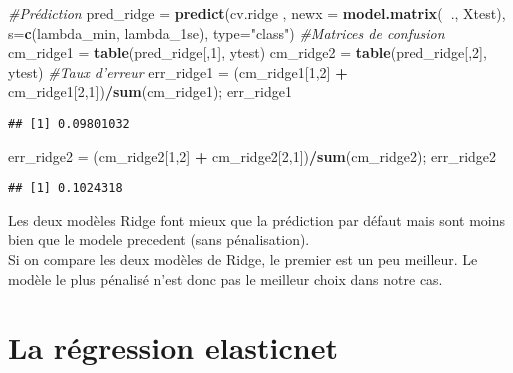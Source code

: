\documentclass[
]{article}
\newenvironment{Shaded}{\begin{snugshade}}{\end{snugshade}}
\newcommand{\CommentTok}[1]{\textcolor[rgb]{0.56,0.35,0.01}{\textit{#1}}}
\newcommand{\DataTypeTok}[1]{\textcolor[rgb]{0.13,0.29,0.53}{#1}}
\newcommand{\DecValTok}[1]{\textcolor[rgb]{0.00,0.00,0.81}{#1}}
\newcommand{\KeywordTok}[1]{\textcolor[rgb]{0.13,0.29,0.53}{\textbf{#1}}}
\newcommand{\NormalTok}[1]{#1}
\newcommand{\OperatorTok}[1]{\textcolor[rgb]{0.81,0.36,0.00}{\textbf{#1}}}
\newcommand{\StringTok}[1]{\textcolor[rgb]{0.31,0.60,0.02}{#1}}
\begin{document}
\begin{Shaded}
\begin{Highlighting}[]
\CommentTok{#Prédiction}
\NormalTok{pred_ridge =}\StringTok{ }\KeywordTok{predict}\NormalTok{(cv.ridge , }\DataTypeTok{newx =} \KeywordTok{model.matrix}\NormalTok{(}\OperatorTok{~}\NormalTok{., Xtest), }\DataTypeTok{s=}\KeywordTok{c}\NormalTok{(lambda_min, lambda_1se), }\DataTypeTok{type=}\StringTok{"class"}\NormalTok{)}
\CommentTok{#Matrices de confusion}
\NormalTok{cm_ridge1 =}\StringTok{ }\KeywordTok{table}\NormalTok{(pred_ridge[,}\DecValTok{1}\NormalTok{], ytest)}
\NormalTok{cm_ridge2 =}\StringTok{ }\KeywordTok{table}\NormalTok{(pred_ridge[,}\DecValTok{2}\NormalTok{], ytest)}
\CommentTok{#Taux d'erreur}
\NormalTok{err_ridge1 =}\StringTok{ }\NormalTok{(cm_ridge1[}\DecValTok{1}\NormalTok{,}\DecValTok{2}\NormalTok{] }\OperatorTok{+}\StringTok{ }\NormalTok{cm_ridge1[}\DecValTok{2}\NormalTok{,}\DecValTok{1}\NormalTok{])}\OperatorTok{/}\KeywordTok{sum}\NormalTok{(cm_ridge1); err_ridge1}
\end{Highlighting}
\end{Shaded}

\begin{verbatim}
## [1] 0.09801032
\end{verbatim}

\begin{Shaded}
\begin{Highlighting}[]
\NormalTok{err_ridge2 =}\StringTok{ }\NormalTok{(cm_ridge2[}\DecValTok{1}\NormalTok{,}\DecValTok{2}\NormalTok{] }\OperatorTok{+}\StringTok{ }\NormalTok{cm_ridge2[}\DecValTok{2}\NormalTok{,}\DecValTok{1}\NormalTok{])}\OperatorTok{/}\KeywordTok{sum}\NormalTok{(cm_ridge2); err_ridge2}
\end{Highlighting}
\end{Shaded}

\begin{verbatim}
## [1] 0.1024318
\end{verbatim}

Les deux modèles Ridge font mieux que la prédiction par défaut mais sont
moins bien que le modele precedent (sans pénalisation).\\
Si on compare les deux modèles de Ridge, le premier est un peu meilleur.
Le modèle le plus pénalisé n'est donc pas le meilleur choix dans notre
cas.

\hypertarget{la-ruxe9gression-elasticnet}{%
\section{La régression elasticnet}\label{la-ruxe9gression-elasticnet}}
\end{document}
